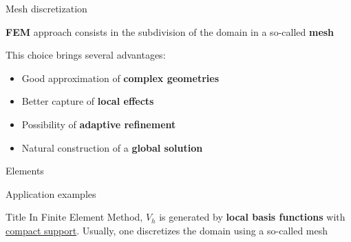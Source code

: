 \documentclass[10pt,externalviewer]{beamer}
\begin{document}
\begin{frame}{Mesh discretization}
   \begin{center}
      \begin{framed}
         \textbf{FEM} approach consists in the subdivision of the domain in a so-called \textbf{\textcolor{BrickRed}{mesh}}
      \end{framed}
   \end{center}

   \pause

   This choice brings several advantages:

   \begin{itemize}
      \item Good approximation of \textbf{complex geometries}
      \item Better capture of \textbf{local effects}
      \item Possibility of \textbf{adaptive refinement}
      \item Natural construction of a \textbf{global solution}
   \end{itemize}

\end{frame}

\begin{frame}{Elements}
   \begin{figure}[H]
      \centering
   \end{figure}
\end{frame}

\begin{frame}{Application examples}

\end{frame}

\begin{frame}{Title}
   In \textcolor{BrickRed}{F}inite \textcolor{BrickRed}{E}lement \textcolor{BrickRed}{M}ethod, $V_h$ is generated by \textbf{local basis functions} with \underline{compact support}. Usually, one discretizes the domain using a so-called mesh
\end{frame}
\end{document}
